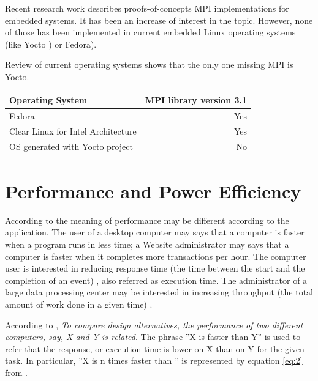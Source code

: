 Recent research work \cite{Saldana} \cite{Gallego} \cite{McMahon} describes
proofs-of-concepts MPI implementations for embedded systems. It has been an
increase of interest in the topic. However, none of those has been implemented
in current embedded Linux operating systems (like Yocto \cite{yocto-project})
or Fedora\cite{fedora}).

Review of current operating systems shows that the only
one missing  MPI is Yocto.


\begin{center}
\begin{tabular}{ | l | r |}
    \hline
    \textbf{Operating System} & \textbf{MPI library version 3.1}  \\ \hline
    Fedora & Yes  \\ \hline
    Clear Linux for Intel Architecture & Yes \\ \hline
    OS generated with Yocto project & No \\ \hline
\end{tabular}
\label{tab:3.2}
\end{center}


\section{Performance and Power Efficiency}

\noindent

According to \cite{Hennessy} the meaning of performance may be different according to the application.
The user of a desktop computer may says that  a computer is faster when a program runs in less
time; a Website administrator may says that a computer is faster when it
completes more transactions per hour. The computer user is interested in 
reducing response time (the time between the start and the completion of an 
event) \cite{Hennessy}, also referred as execution time. The administrator of a large data 
processing center may be interested in increasing throughput (the total amount 
of work done in a given time) \cite{Hennessy}. 

According to \cite{Hennessy}, \textit{ To compare design alternatives, the
performance of two different computers, say, X and Y is related}. The phrase ''X
is faster than Y'' is used to refer that the response, or execution
time is lower on X than on Y for the given task. In particular, ''X is n times
faster than ''  is represented by equation \ref{eq:2} from \cite{Hennessy}.

